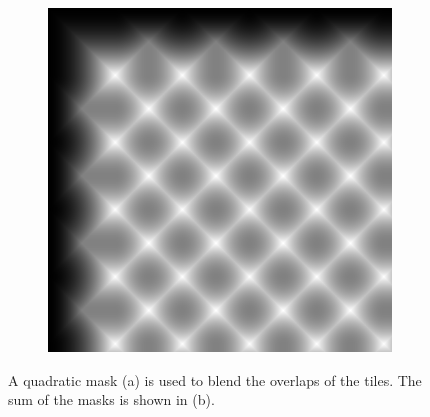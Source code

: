 \documentclass[11pt,a4paper,titlepage]{article}
\begin{document}
\begin{figure}
\begin{subfigure}[t]{0.30\textwidth}
		\includegraphics[width=\textwidth]{results/tile_blending/tarot6x6x512x512-512x512x5-sampling=2x_tileRes=200x200_overlap=0.5/blendingMaskSum.png}
		\caption{}
		\label{fig:sum_of_quadratic_blending_masks}
	\end{subfigure}%
	
	\caption{A quadratic mask (a) is used to blend the overlaps of the tiles. The sum of the masks is shown in (b).}
	\label{fig:blending_mask_for_tiles}
\end{figure}
\end{document}
